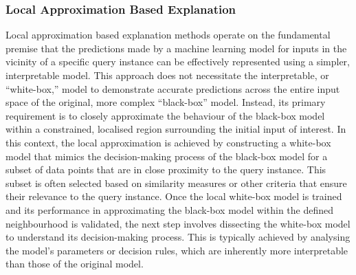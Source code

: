 \subsubsection{Local Approximation Based Explanation}

Local approximation based explanation methods operate on the fundamental premise that the predictions made by a machine learning model for inputs in the vicinity of a specific query instance can be effectively represented using a simpler, interpretable model. This approach does not necessitate the interpretable, or ``white-box,'' model to demonstrate accurate predictions across the entire input space of the original, more complex ``black-box'' model. Instead, its primary requirement is to closely approximate the behaviour of the black-box model within a constrained, localised region surrounding the initial input of interest. In this context, the local approximation is achieved by constructing a white-box model that mimics the decision-making process of the black-box model for a subset of data points that are in close proximity to the query instance. This subset is often selected based on similarity measures or other criteria that ensure their relevance to the query instance. Once the local white-box model is trained and its performance in approximating the black-box model within the defined neighbourhood is validated, the next step involves dissecting the white-box model to understand its decision-making process. This is typically achieved by analysing the model's parameters or decision rules, which are inherently more interpretable than those of the original model.

